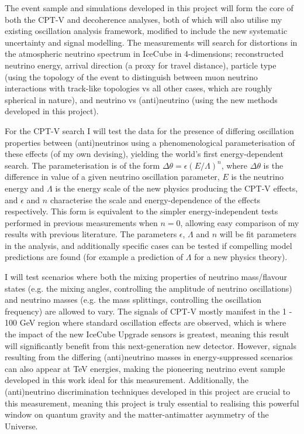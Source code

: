 \documentclass[a4paper,11pt]{article}
\begin{document}
The event sample and simulations developed in this project will form the core of both the CPT-V and decoherence analyses, both of which will also utilise my existing oscillation analysis framework, modified to include the new systematic uncertainty and signal modelling. The measurements will search for distortions in the atmospheric neutrino spectrum in IceCube in 4-dimensions; reconstructed neutrino energy, arrival direction (a proxy for travel distance), particle type (using the topology of the event to distinguish between muon neutrino interactions with track-like topologies vs all other cases, which are roughly spherical in nature), and neutrino vs (anti)neutrino (using the new methods developed in this project).

For the CPT-V search I will test the data for the presence of differing oscillation properties between (anti)neutrinos using a phenomenological parameterisation of these effects (of my own devising), yielding the world's first energy-dependent search. The parameterisation is of the form $\Delta \theta = \epsilon (E/\Lambda)^n$, where $\Delta \theta$ is the difference in value of a given neutrino oscillation parameter, $E$ is the neutrino energy and $\Lambda$ is the energy scale of the new physics producing the CPT-V effects, and $\epsilon$ and $n$ characterise the scale and energy-dependence of the effects respectively. This form is equivalent to the simpler energy-independent tests performed in previous measurements when $n=0$, allowing easy comparison of my results with previous literature. The parameters $\epsilon$, $\Lambda$ and $n$ will be fit parameters in the analysis, and additionally specific cases can be tested if compelling model predictions are found (for example a prediction of $\Lambda$ for a new physics theory). 

I will test scenarios where both the mixing properties of neutrino mass/flavour states (e.g. the mixing angles, controlling the amplitude of neutrino oscillations) and neutrino masses (e.g. the mass splittings, controlling the oscillation frequency) are allowed to vary. The signals of CPT-V mostly manifest in the 1 - 100 GeV region where standard oscillation effects are observed, which is where the impact of the new IceCube Upgrade sensors is greatest, meaning this result will significantly benefit from this next-generation new detector. However, signals resulting from the differing (anti)neutrino masses in energy-suppressed scenarios can also appear at TeV energies, making the pioneering neutrino event sample developed in this work ideal for this measurement. Additionally, the (anti)neutrino discrimination techniques developed in this project are crucial to this measurement, meaning this project is truly essential to realising this powerful window on quantum gravity and the matter-antimatter asymmetry of the Universe.
\end{document}
